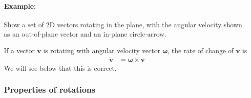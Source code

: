 \documentclass{article}
\renewcommand{\vec}[1]{\boldsymbol{#1}}
\begin{document}
\paragraph{Example:} Show a set of 2D vectors rotating in the plane,
with the angular velocity shown as an out-of-plane vector and an
in-plane circle-arrow.

If a vector $\vec{v}$ is rotating with angular velocity vector
$\vec{\omega}$, the rate of change of $\vec{v}$ is
\begin{align}
  \dot{\vec{v}} &= \vec{\omega} \times \vec{v}
\end{align}
We will see below that this is correct.

\subsubsection{Properties of rotations}
\end{document}
